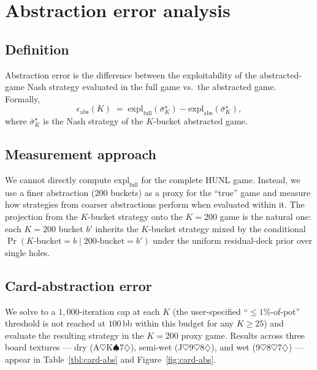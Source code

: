 \section{Abstraction error analysis}
\label{sec:abstraction-error}

\subsection{Definition}

Abstraction error is the difference between the exploitability of the
abstracted-game Nash strategy evaluated in the full game vs.\ the
abstracted game. Formally,
\[
  \epsilon_{\mathrm{abs}}(K)
    \;=\; \mathrm{expl}_{\mathrm{full}}(\bar{\sigma}^\star_K)
       - \mathrm{expl}_{\mathrm{abs}}(\bar{\sigma}^\star_K),
\]
where $\bar{\sigma}^\star_K$ is the Nash strategy of the $K$-bucket
abstracted game.

\subsection{Measurement approach}

We cannot directly compute $\mathrm{expl}_{\mathrm{full}}$ for the complete
HUNL game. Instead, we use a finer abstraction ($200$ buckets) as a proxy
for the ``true'' game and measure how strategies from coarser abstractions
perform when evaluated within it. The projection from the $K$-bucket
strategy onto the $K\!=\!200$ game is the natural one: each $K\!=\!200$
bucket $b'$ inherits the $K$-bucket strategy mixed by the conditional
$\Pr(K\text{-bucket} = b \mid 200\text{-bucket} = b')$ under the
uniform residual-deck prior over single holes.

\subsection{Card-abstraction error}

We solve to a $1{,}000$-iteration cap at each $K$ (the user-specified
``$\leq 1\%$-of-pot'' threshold is not reached at $100$\,bb within this
budget for any $K\!\geq\!25$) and evaluate the resulting strategy in the
$K\!=\!200$ proxy game. Results across three board textures --- dry
(A$\heartsuit$K$\spadesuit$7$\diamondsuit$), semi-wet
(J$\heartsuit$9$\heartsuit$8$\diamondsuit$), and wet
(9$\heartsuit$8$\heartsuit$7$\diamondsuit$) --- appear in
Table~\ref{tbl:card-abs} and Figure~\ref{fig:card-abs}.

